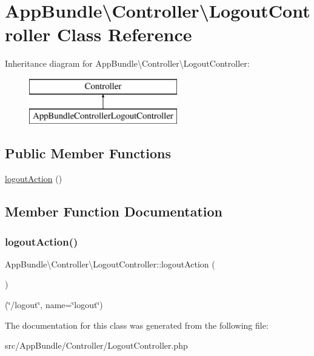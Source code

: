\hypertarget{class_app_bundle_1_1_controller_1_1_logout_controller}{}\section{App\+Bundle\textbackslash{}Controller\textbackslash{}Logout\+Controller Class Reference}
\label{class_app_bundle_1_1_controller_1_1_logout_controller}
Inheritance diagram for App\+Bundle\textbackslash{}Controller\textbackslash{}Logout\+Controller\+:\begin{figure}[H]
\begin{center}
\leavevmode
\includegraphics[height=2.000000cm]{class_app_bundle_1_1_controller_1_1_logout_controller}
\end{center}
\end{figure}
\subsection*{Public Member Functions}
\begin{DoxyCompactItemize}
\item 
\mbox{\hyperlink{class_app_bundle_1_1_controller_1_1_logout_controller_ad04fdf5190d7570532321bb806357319}{logout\+Action}} ()
\end{DoxyCompactItemize}


\subsection{Member Function Documentation}
\mbox{\label{class_app_bundle_1_1_controller_1_1_logout_controller_ad04fdf5190d7570532321bb806357319}} 
\subsubsection{\texorpdfstring{logout\+Action()}{logoutAction()}}
{\footnotesize\ttfamily App\+Bundle\textbackslash{}\+Controller\textbackslash{}\+Logout\+Controller\+::logout\+Action (\begin{DoxyParamCaption}{ }\end{DoxyParamCaption})}

(\char`\"{}/logout\char`\"{}, name=\char`\"{}logout\char`\"{}) 

The documentation for this class was generated from the following file\+:\begin{DoxyCompactItemize}
\item 
src/\+App\+Bundle/\+Controller/Logout\+Controller.\+php\end{DoxyCompactItemize}
